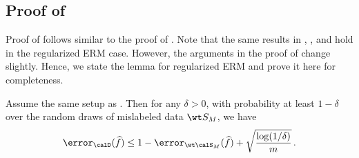 \subsection{Proof of }

Proof of  follows similar to the proof of . Note that the same results in , , and  hold in the regularized ERM case. However, the arguments in the proof of  change slightly. Hence, we state the lemma for regularized ERM and prove it here for completeness. 

\begin{lemma} \label{lem:lemma1_reg}
    Assume the same setup as . 
    Then for any $\delta >0$, with probability at least  $1-\delta$ 
    over the random draws of mislabeled data $\wt S_M$, we have 
    \begin{align}
        \error_\calD(\widehat f)  \le 1 -\error_{\wt \calS_M}(\widehat f) + \sqrt{\frac{\log(1/\delta)}{m}}\,. 
    \end{align} 
\end{lemma}
